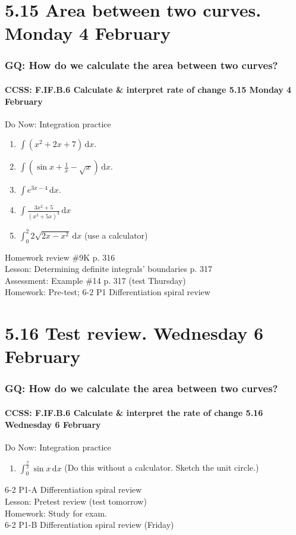 \documentclass{beamer}
\begin{document}
\section{5.15 Area between two curves. Monday 4 February}
  \frame
  {
    \frametitle{GQ: How do we calculate the area between two curves?}
    \framesubtitle{CCSS: F.IF.B.6 Calculate \& interpret rate of change \hfill \alert{5.15 Monday 4 February}}

    \begin{block}{Do Now: Integration practice}
    \begin{enumerate}
      \item $\int (x^2+2x+7) \,\mathrm{d}x$.
      \item $\int (\sin x + \frac{1}{x} - \sqrt{x}) \,\mathrm{d}x$.
      \item $\int e^{3x-4} \,\mathrm{d}x$.
      \item $\displaystyle \int \frac{3x^2+5}{(x^3+5x)^3} \,\mathrm{d}x$
      \item $\displaystyle \int_0^2 2 \sqrt{2x-x^2} \,\mathrm{d}x$ (use a calculator)
    \end{enumerate}
    \end{block}
    Homework review \#9K p. 316\\
    Lesson: Determining definite integrals' boundaries p. 317\\%
    Assessment: Example \#14 p. 317 (\alert{test Thursday})\\%
    Homework: Pre-test; 6-2 P1 Differentiation spiral review
  }

\section{5.16 Test review. Wednesday 6 February}
  \frame
  {
    \frametitle{GQ: How do we calculate the area between two curves?}
    \framesubtitle{CCSS: F.IF.B.6 Calculate \& interpret the rate of change \hfill \alert{5.16 Wednesday 6 February}}

    \begin{block}{Do Now: Integration practice}
    \begin{enumerate}
      \item $\displaystyle \int_0^{\frac{\pi}{2}} \sin x \,\mathrm{d}x$ (Do this without a calculator. Sketch the unit circle.)
    \end{enumerate}
    \end{block}
    6-2 P1-A Differentiation spiral review\\
    Lesson: Pretest review (\alert{test tomorrow})\\%
    Homework: Study for exam.\\
    6-2 P1-B Differentiation spiral review (Friday)
  }
\end{document}
